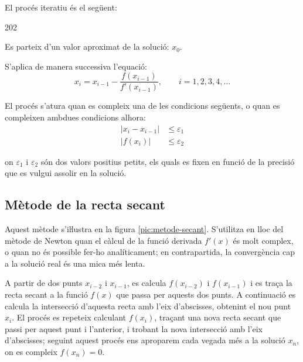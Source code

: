 El procés iteratiu és el següent:

\begin{dingautolist}{202}
    \item Es parteix d'un valor aproximat de la solució: $x_0$.

    \item   S'aplica de manera successiva l'equació:
            \begin{equation}\label{eq:newton}
              x_i = x_{i-1} - \frac{f(x_{i-1})}{f'(x_{i-1})}, \qquad i=1,2,3,4, \dots
            \end{equation}

    \item   El procés s'atura quan es compleix una de les condicions següents, o quan es compleixen ambdues condicions alhora:
            \begin{subequations}\begin{align}
              |x_i - x_{i-1}| &\leq \varepsilon_1 \\
              |f(x_i)| &\leq \varepsilon_2
            \end{align}\end{subequations}

            on $\varepsilon_1$ i $\varepsilon_2$ són dos valors positius petits, els quals es fixen en funció de la precisió que es vulgui assolir en la solució.
\end{dingautolist}



\subsection{Mètode de la recta secant}

Aquest mètode s'iŀlustra en la figura \vref{pic:metode-secant}. S'utilitza en lloc del mètode de Newton quan el càlcul de  la funció derivada $f'(x)$ és molt complex, o quan no és possible fer-ho analíticament; en contrapartida, la convergència cap a la solució real és una
mica més lenta.

A partir de dos punts $x_{i-2}$ i $x_{i-1}$, es calcula $f(x_{i-2})$ i $f(x_{i-1})$ i es traça la recta secant a la funció $f(x)$ que passa per aquests dos punts. A continuació es calcula la intersecció d'aquesta recta amb l'eix d'abscisses, obtenint el nou punt $x_i$. El procés es repeteix calculant $f(x_i)$, traçant una nova recta secant que passi per aquest punt i l'anterior, i trobant la nova intersecció amb l'eix d'abscisses; seguint aquest procés ens aproparem cada vegada més a la solució $x_n$, on es compleix $f(x_n)=0$.

